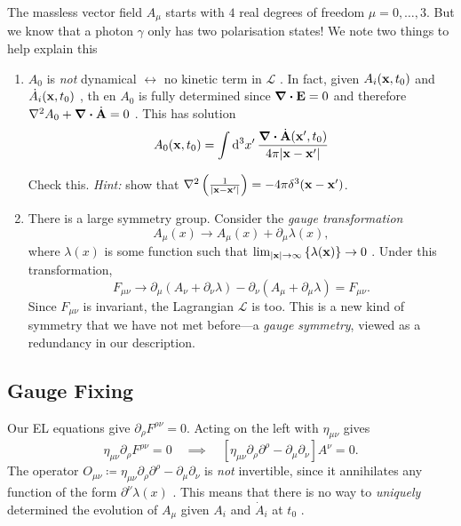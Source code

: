 The massless vector field $A_{\mu}$  starts with $4$ real degrees of freedom  $\mu = 0, \dots, 3$. But we know that a photon $\gamma$  only has two polarisation states!
We note two things to help explain this
\begin{enumerate}[i]
  \item $A_0$ is \emph{not} dynamical $\leftrightarrow$ no kinetic term in $\mathcal{L}$ .
    In fact, given $A_{i} (\vb{x}, t_0)$ and $\dot{A}_{i} (\vb{x}, t_0)$ , th en $A_0$  is fully determined since $\div \vb{E} =0$ and therefore $\laplacian A_0 + \div \dot{\vb{A}} = 0$ . This has solution
    \begin{equation}
      \label{eq:19-dagger}
      A_0(\vb{x}, t_0) = \int \dd[3]{x'} \frac{\div \dot{\vb{A}} (\vb{x}', t_0)}{4\pi \abs{\vb{x} - \vb{x}'}}
    \end{equation}
    \begin{exercise}
      Check this. \emph{Hint:} show that $\laplacian \left( \frac{1}{\abs{\vb{x} - \vb{x}'}} \right) = - 4\pi \delta^3 (\vb{x} - \vb{x}')$.
    \end{exercise}
    \item There is a large symmetry group. Consider the \emph{gauge transformation}
      \begin{equation}
	A_{\mu}(x) \to A_{\mu}(x) + \partial_{\mu} \lambda(x),
      \end{equation}
      where $\lambda(x)$ is some function such that  $\lim_{\abs{\vb{x}} \to \infty} \left\{ \lambda(\vb{x}) \right\} \to 0$ .
      Under this transformation, 
      \begin{equation}
	F_{\mu\nu} \to \partial_{\mu} (A_{\nu} + \partial_{\nu} \lambda) - \partial_{\nu} (A_{\mu} + \partial_{\mu} \lambda) = F_{\mu\nu}.
      \end{equation}
      Since $F_{\mu\nu}$ is invariant, the Lagrangian $\mathcal{L}$ is too.
      This is a new kind of symmetry that we have not met before---a \emph{gauge symmetry}, viewed as a redundancy in our description.
\end{enumerate}

\subsection{Gauge Fixing}%
\label{sub:gauge_fixing}

Our EL equations give $\partial_{\rho} F^{\rho\nu} = 0$. Acting on the left with $\eta_{\mu\nu}$ gives
\begin{equation}
  \eta_{\mu\nu} \partial_{\rho} F^{\rho\nu} = 0 \quad \implies \quad [\eta_{\mu\nu} \partial_{\rho} \partial^{\rho} - \partial_{\mu} \partial_{\nu}] A^{\nu}= 0.
\end{equation}
The operator $O_{\mu\nu} \coloneqq \eta_{\mu\nu} \partial_{\rho} \partial^{\rho} - \partial_{\mu} \partial_{\nu}$  is \emph{not} invertible, since it annihilates any function of the form $\partial^{\nu} \lambda(x)$ . This means that there is no way to \emph{uniquely} determined the evolution of $A_{\mu}$  given $A_{i}$ and $\dot A_{i}$  at $t_0$ .

